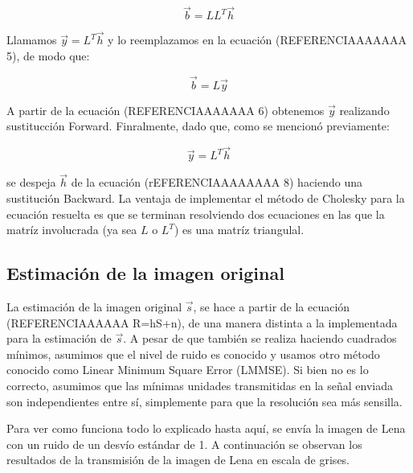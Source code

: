 \begin{equation} 
\vec{b} = L L^T \vec{h}  %
\end{equation} 

Llamamos $\vec{y} = L^T \vec{h}$ y lo reemplazamos en la ecuaci\'on (REFERENCIAAAAAAA 5), de modo que:

\begin{equation} 
\vec{b} = L \vec{y}  %
\end{equation} 

A partir de la ecuaci\'on (REFERENCIAAAAAAA 6) obtenemos $ \vec{y}$ realizando sustitucci\'on Forward. Finralmente, dado que, como se mencion\'o previamente:

 \begin{equation} 
\vec{y} = L^T \vec{h} %
\end{equation}

se despeja $\vec{h}$ de la ecuaci\'on (rEFERENCIAAAAAAAA 8) haciendo una sustituci\'on Backward. La ventaja de implementar el m\'etodo de Cholesky para la ecuaci\'on resuelta es que se terminan resolviendo dos ecuaciones en las que la matr\'iz involucrada (ya sea $L$ o $L^T$) es una matr\'iz triangulal.

\subsection{Estimaci\'on de la imagen original}

La estimaci\'on de la imagen original $\vec{s}$, se hace a partir de la ecuaci\'on (REFERENCIAAAAAA R=hS+n), de una manera distinta a la implementada para la estimaci\'on de  $\vec{s}$. A pesar de que tambi\'en se realiza haciendo cuadrados m\'inimos, asumimos que el nivel de ruido es conocido y usamos otro m\'etodo  conocido como Linear Minimum Square Error (LMMSE). Si bien no es lo correcto, asumimos que las m\'inimas unidades transmitidas en la se\~nal enviada son independientes entre s\'i, simplemente para que la resoluci\'on sea m\'as sensilla. 


Para ver como funciona todo lo explicado hasta aqu\'i, se env\'ia la imagen de Lena con un ruido de un desv\'io est\'andar de 1. A continuaci\'on se observan los resultados de la transmisi\'on de la imagen de Lena en escala de grises.
 
